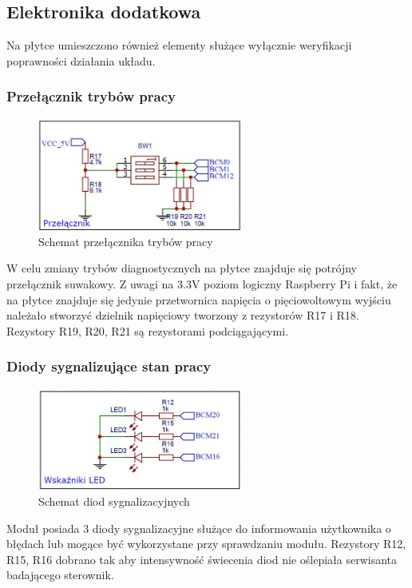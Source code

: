 \documentclass[12pt, eng, twoside, openany, final]{mgr}
\begin{document}
        \subsection{Elektronika dodatkowa}
        Na płytce umieszczono również elementy służące wyłącznie weryfikacji poprawności działania układu.
        
        \subsubsection{Przełącznik trybów pracy}
            \begin{figure}[H]
            \begin{center}
                \includegraphics[width=0.6\textwidth]{przelacznik1.jpg}
                \caption{Schemat przełącznika trybów pracy}
            \end{center}
            \end{figure}
        W celu zmiany trybów diagnostycznych na płytce znajduje się potrójny przełącznik suwakowy. Z uwagi na 3.3V poziom logiczny Raspberry Pi i fakt, że na płytce znajduje się jedynie przetwornica napięcia o pięciowoltowym wyjściu należało stworzyć dzielnik napięciowy tworzony z rezystorów R17 i R18. Rezystory R19, R20, R21 są rezystorami podciągającymi.  
        \subsubsection{Diody sygnalizujące stan pracy}
            \begin{figure}[H]
            \begin{center}
                \includegraphics[width=0.6\textwidth]{wskaznik1.jpg}
                \caption{Schemat diod sygnalizacyjnych} 
            \end{center}
            \end{figure}
        Moduł posiada 3 diody sygnalizacyjne służące do informowania użytkownika o błędach lub mogące być wykorzystane przy sprawdzaniu modułu. Rezystory R12, R15, R16 dobrano tak aby intensywność świecenia diod nie oślepiała serwisanta badającego sterownik.\newpage
        
\end{document}
